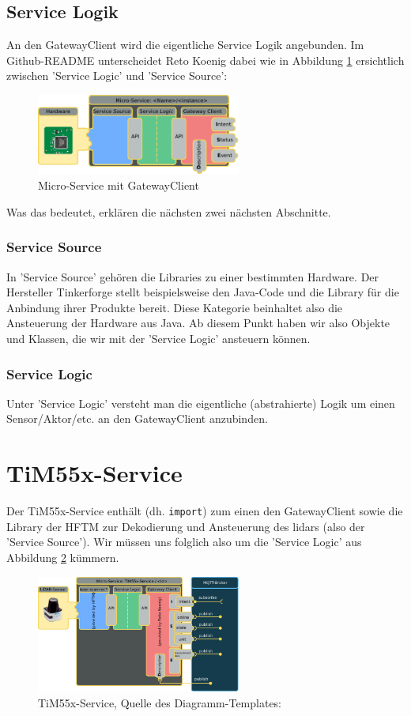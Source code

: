 \subsection{Service Logik}
An den GatewayClient wird die eigentliche Service Logik angebunden. Im Github-README unterscheidet Reto Koenig\cite{ch.quantasy.mqtt.gateway} dabei wie in Abbildung \ref{fig:microService} ersichtlich zwischen 'Service Logic' und 'Service Source':
\begin{figure}[H]
	\centering
	\includegraphics[width=0.6\textwidth]{img/gatewayclient-microservice.pdf}
	\caption{Micro-Service mit GatewayClient \cite{ch.quantasy.mqtt.gateway}}
	\label{fig:microService}
\end{figure}
Was das bedeutet, erklären die nächsten zwei nächsten Abschnitte.
\subsubsection{Service Source}
In 'Service Source' gehören die Libraries zu einer bestimmten Hardware. Der Hersteller Tinkerforge\cite{tinkerforge-gmbh} stellt beispielsweise den Java-Code und die Library für die Anbindung ihrer Produkte bereit. Diese Kategorie beinhaltet also die Ansteuerung der Hardware aus Java. Ab diesem Punkt haben wir also Objekte und Klassen, die wir mit der 'Service Logic' ansteuern können.
\subsubsection{Service Logic}
Unter 'Service Logic' versteht man die eigentliche (abstrahierte) Logik um einen Sensor/Aktor/etc. an den GatewayClient anzubinden.


\section{TiM55x-Service}
Der TiM55x-Service enthält (dh. \verb|import|) zum einen den GatewayClient sowie die Library der HFTM zur Dekodierung und Ansteuerung des \acrshort{lidar}s (also der 'Service Source'). Wir müssen uns folglich also um die 'Service Logic' aus Abbildung \ref{fig:lidarservice} kümmern.
\begin{figure}[H]
	\centering
	\includegraphics[width=0.6\textwidth]{img/tim55xservice.pdf}
	\caption{TiM55x-Service, Quelle des Diagramm-Templates: \cite{ch.quantasy.mqtt.gateway}}
	\label{fig:lidarservice}
\end{figure}

